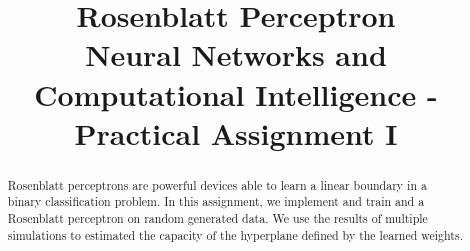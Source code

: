 \documentclass[conference]{IEEEtran}
\begin{document}
\title{
    Rosenblatt Perceptron\\
    \large Neural Networks and Computational Intelligence - Practical Assignment I
}

\author{
    \and
}

\maketitle

\begin{abstract}
    Rosenblatt perceptrons are powerful devices able to learn a linear boundary in a binary classification problem.
    In this assignment, we implement and train and a Rosenblatt perceptron on random generated data.
    We use the results of multiple simulations to estimated the capacity of the hyperplane defined by the learned weights.
\end{abstract}

\acresetall










% 
\end{document}
